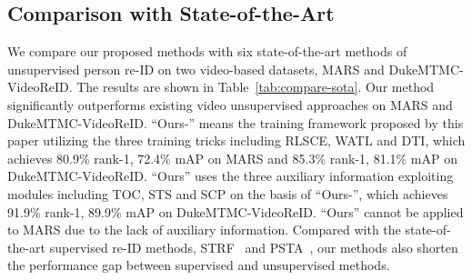 \documentclass[10pt,twocolumn,letterpaper]{article}
\begin{document}
\subsection{Comparison with State-of-the-Art}

We compare our proposed methods with six state-of-the-art methods of unsupervised person re-ID on two video-based datasets, MARS and DukeMTMC-VideoReID. The results are shown in Table~\ref{tab:compare-sota}. Our method significantly outperforms existing video unsupervised approaches on MARS and DukeMTMC-VideoReID. ``Ours-'' means the training framework proposed by this paper utilizing the three training tricks including RLSCE, WATL and DTI, which achieves 80.9\% rank-1, 72.4\% mAP on MARS and 85.3\% rank-1, 81.1\% mAP on DukeMTMC-VideoReID. ``Ours'' uses the three auxiliary information exploiting modules including TOC, STS and SCP on the basis of ``Ours-'', which achieves 91.9\% rank-1, 89.9\% mAP on DukeMTMC-VideoReID. ``Ours'' cannot be applied to MARS due to the lack of auxiliary information. Compared with the state-of-the-art supervised re-ID methods, STRF~\cite{strf} and PSTA~\cite{psta}, our methods also shorten the performance gap between supervised and unsupervised methods.
\end{document}
